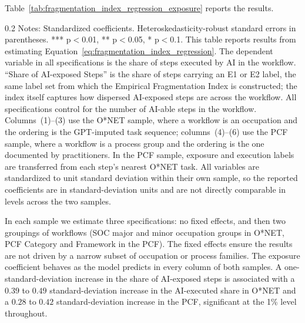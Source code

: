 Table~\ref{tab:fragmentation_index_regression_exposure} reports the results.
\begin{table}[!t]
    \caption{AI-exposed Step Fragmentation and AI Execution Outcomes}
    \label{tab:fragmentation_index_regression_exposure}
    \footnotesize
    \centering
    \begin{minipage}{1\linewidth}
\begin{spacing}{0.2}
{\fontsize{9.5pt}{10pt}\selectfont Notes: Standardized coefficients. Heteroskedasticity-robust standard errors in parentheses. *** p$<$0.01, ** p$<$0.05, * p$<$0.1.
This table reports results from estimating Equation~\eqref{eq:fragmentation_index_regression}.
The dependent variable in all specifications is the share of steps executed by AI in the workflow.
``Share of AI-exposed Steps'' is the share of steps carrying an E1 or E2 label, the same label set from which the Empirical Fragmentation Index is constructed; the index itself captures how dispersed AI-exposed steps are across the workflow.
All specifications control for the number of AI-able steps in the workflow. 
Columns~(1)--(3) use the O*NET sample, where a workflow is an occupation and the ordering is the GPT-imputed task sequence; columns~(4)--(6) use the PCF sample, where a workflow is a process group and the ordering is the one documented by practitioners.
In the PCF sample, exposure and execution labels are transferred from each step's nearest O*NET task.
All variables are standardized to unit standard deviation within their own sample, so the reported coefficients are in standard-deviation units and are not directly comparable in levels across the two samples.}
\end{spacing}
\end{minipage}\end{table}
In each sample we estimate three specifications: no fixed effects, and then two groupings of workflows (SOC major and minor occupation groups in O*NET, PCF Category and Framework in the PCF).
The fixed effects ensure the results are not driven by a narrow subset of occupation or process families.
The exposure coefficient behaves as the model predicts in every column of both samples.
A one-standard-deviation increase in the share of AI-exposed steps is associated with a $0.39$ to $0.49$ standard-deviation increase in the AI-executed share in O*NET and a $0.28$ to $0.42$ standard-deviation increase in the PCF, significant at the 1\% level throughout.

